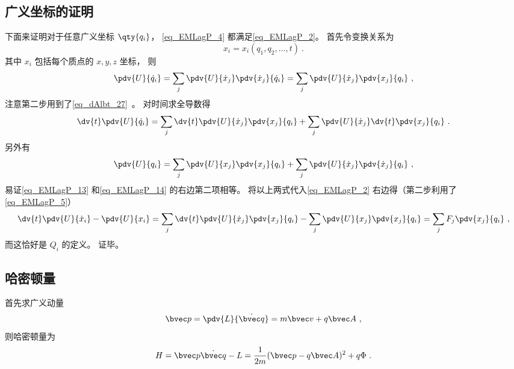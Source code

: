 \subsection{广义坐标的证明}
下面来证明对于任意广义坐标 $\qty{q_i}$， \autoref{eq_EMLagP_4} 都满足\autoref{eq_EMLagP_2}。 首先令变换关系为
\begin{equation}
x_i = x_i(q_1, q_2, \dots, t)~.
\end{equation}
其中 $x_i$ 包括每个质点的 $x, y, z$ 坐标， 则
\begin{equation}
\pdv{U}{\dot q_i} = \sum_j \pdv{U}{\dot x_j} \pdv{\dot x_j}{\dot q_i} = \sum_j \pdv{U}{\dot x_j} \pdv{x_j}{q_i}~,
\end{equation}
注意第二步用到了\autoref{eq_dAlbt_27}~。 对时间求全导数得
\begin{equation}\label{eq_EMLagP_13}
\dv{t} \pdv{U}{\dot q_i} = \sum_j \dv{t}\pdv{U}{\dot x_j} \pdv{x_j}{q_i} + \sum_j \pdv{U}{\dot x_j} \dv{t} \pdv{x_j}{q_i}~.
\end{equation}
另外有
\begin{equation}\label{eq_EMLagP_14}
\pdv{U}{q_i} = \sum_j \pdv{U}{x_j} \pdv{x_j}{q_i} + \sum_j \pdv{U}{\dot x_j} \pdv{\dot x_j}{q_i}~,
\end{equation}
易证\autoref{eq_EMLagP_13} 和\autoref{eq_EMLagP_14} 的右边第二项相等。 将以上两式代入\autoref{eq_EMLagP_2} 右边得（第二步利用了\autoref{eq_EMLagP_5}）
\begin{equation}
\dv{t} \pdv{U}{\dot x_i} - \pdv{U}{x_i} =  \sum_j \dv{t}\pdv{U}{\dot x_j} \pdv{x_j}{q_i} - \sum_j \pdv{U}{x_j} \pdv{x_j}{q_i} = \sum_j F_j \pdv{x_j}{q_i}~,
\end{equation}
而这恰好是 $Q_i$ 的定义。%
证毕。

\subsection{哈密顿量}

首先求广义动量
\begin{equation}\label{eq_EMLagP_1}
\bvec p = \pdv{L}{\dot{\bvec q}} = m\bvec v + q\bvec A~,
\end{equation}
则哈密顿量为
\begin{equation}\label{eq_EMLagP_3}
H = \bvec p \dot{\bvec q} - L = \frac{1}{2m}(\bvec p - q\bvec A)^2 + q\Phi~.
\end{equation}
